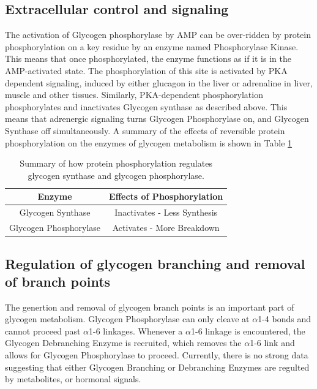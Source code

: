 \documentclass{tufte-handout}
\begin{document}
\subsection{Extracellular control and signaling}

The activation of Glycogen phosphorylase by AMP can be over-ridden by protein phosphorylation on a key residue by an enzyme named Phosphorylase Kinase.  This means that once phosphorylated, the enzyme functions as if it is in the AMP-activated state.  The phosphorylation of this site is activated by PKA dependent signaling, induced by either glucagon in the liver or adrenaline in liver, muscle and other tissues.  Similarly, PKA-dependent phosphorylation phosphorylates and inactivates Glycogen synthase as described above.  This means that adrenergic signaling turns Glycogen Phosphorylase on, and Glycogen Synthase off simultaneously.  A summary of the effects of reversible protein phosphorylation on the enzymes of glycogen metabolism is shown in Table \ref{tab:gs-gp-phosphorylation}

\begin{table}
\centering
\caption{Summary of how protein phosphorylation regulates glycogen synthase and glycogen phosphorylase.}
\label{tab:gs-gp-phosphorylation}
\begin{tabular}{cc}
\hline
\textbf {Enzyme} & \textbf{Effects of Phosphorylation}  \\
\hline
Glycogen Synthase & Inactivates - Less Synthesis \\
Glycogen Phosphorylase & Activates - More Breakdown\\
\hline
\end{tabular}
\end{table}

\subsection{Regulation of glycogen branching and removal of branch points}

The genertion and removal of glycogen branch points is an important part of glycogen metabolism.  Glycogen Phosphorylase can only cleave at $\alpha$1-4 bonds and cannot proceed past $\alpha$1-6 linkages.  Whenever a $\alpha$1-6 linkage is encountered, the Glycogen Debranching Enzyme is recruited, which removes the $\alpha$1-6 link and allows for Glycogen Phosphorylase to proceed.  Currently, there is no strong data suggesting that either Glycogen Branching or Debranching Enzymes are regulted by metabolites, or hormonal signals.
\end{document}
